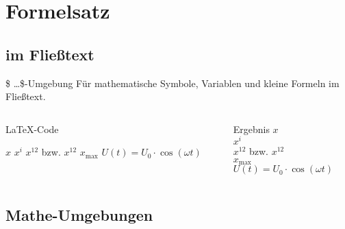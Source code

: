 \section{Formelsatz}

\subsection{im Fließtext}

\begin{frame}[fragile]{\$ \dots \$-Umgebung}
  Für mathematische Symbole, Variablen und kleine Formeln im Fließtext.

  \begin{columns}[T]
    \begin{column}{0.6\textwidth}
      \begin{block}{\LaTeX-Code}
        \begin{lstverbatim}
        $x$
        $x^i$
        $x^12$ bzw. $x^{12}$ %
        $x_\text{max}$
        $U(t) = U_0 \cdot \cos(\omega t)$
        \end{lstverbatim}
      \end{block}
    \end{column}
    \begin{column}{0.35\textwidth}
      \begin{block}{Ergebnis}
        $x$  \\
        $x^i$ \\
        $x^12$ bzw. $x^{12}$ \\
        $x_\text{max}$ \\
        $U(t) = U_0 \cdot \cos(\omega t)$
      \end{block}
    \end{column}
  \end{columns}
\end{frame}

\subsection{Mathe-Umgebungen}

